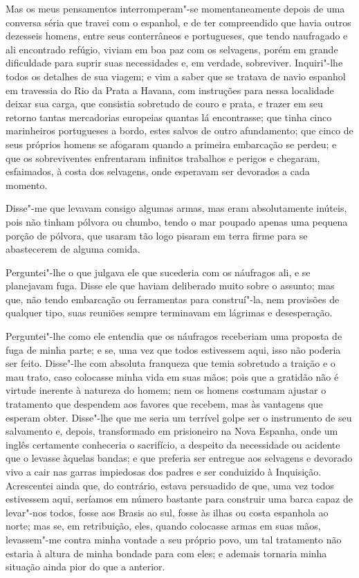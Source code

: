 Mas os meus pensamentos interromperam"-se momentaneamente depois de uma
conversa séria que travei com o espanhol, e de ter compreendido que
havia outros dezesseis homens, entre seus conterrâneos e portugueses,
que tendo naufragado e ali encontrado refúgio, viviam em boa paz com os
selvagens, porém em grande dificuldade para suprir suas necessidades e,
em verdade, sobreviver. Inquiri"-lhe todos os detalhes de sua viagem; e
vim a saber que se tratava de navio espanhol em travessia do Rio da
Prata a Havana, com instruções para nessa localidade deixar sua carga,
que consistia sobretudo de couro e prata, e trazer em seu retorno tantas
mercadorias europeias quantas lá encontrasse; que tinha cinco
marinheiros portugueses a bordo, estes salvos de outro afundamento; que
cinco de seus próprios homens se afogaram quando a primeira embarcação
se perdeu; e que os sobreviventes enfrentaram infinitos trabalhos e
perigos e chegaram, esfaimados, à costa dos selvagens, onde esperavam
ser devorados a cada momento.

Disse"-me que levavam consigo algumas armas, mas eram absolutamente
inúteis, pois não tinham pólvora ou chumbo, tendo o mar poupado apenas
uma pequena porção de pólvora, que usaram tão logo pisaram em terra
firme para se abastecerem de alguma comida.

Perguntei"-lhe o que julgava ele que sucederia com os náufragos ali, e se
planejavam fuga. Disse ele que haviam deliberado muito sobre o assunto;
mas que, não tendo embarcação ou ferramentas para construí"-la, nem
provisões de qualquer tipo, suas reuniões sempre terminavam em lágrimas
e desesperação.

Perguntei"-lhe como ele entendia que os náufragos receberiam uma proposta
de fuga de minha parte; e se, uma vez que todos estivessem aqui, isso
não poderia ser feito. Disse"-lhe com absoluta franqueza que temia
sobretudo a traição e o mau trato, caso colocasse minha vida em suas
mãos; pois que a gratidão não é virtude inerente à natureza do homem;
nem os homens costumam ajustar o tratamento que despendem aos favores
que recebem, mas às vantagens que esperam obter. Disse"-lhe que me seria
um terrível golpe ser o instrumento de seu salvamento e, depois,
transformado em prisioneiro na Nova Espanha, onde um inglês certamente
conheceria o sacrifício, a despeito da necessidade ou acidente que o
levasse àquelas bandas; e que preferia ser entregue aos selvagens e
devorado vivo a cair nas garras impiedosas dos padres e ser conduizido à
Inquisição. Acrescentei ainda que, do contrário, estava persuadido de
que, uma vez todos estivessem aqui, seríamos em número bastante para
construir uma barca capaz de levar"-nos todos, fosse aos Brasis ao sul,
fosse às ilhas ou costa espanhola ao norte; mas se, em retribuição,
eles, quando colocasse armas em suas mãos, levassem"-me contra minha
vontade a seu próprio povo, um tal tratamento não estaria à altura de
minha bondade para com eles; e ademais tornaria minha situação ainda
pior do que a anterior.

